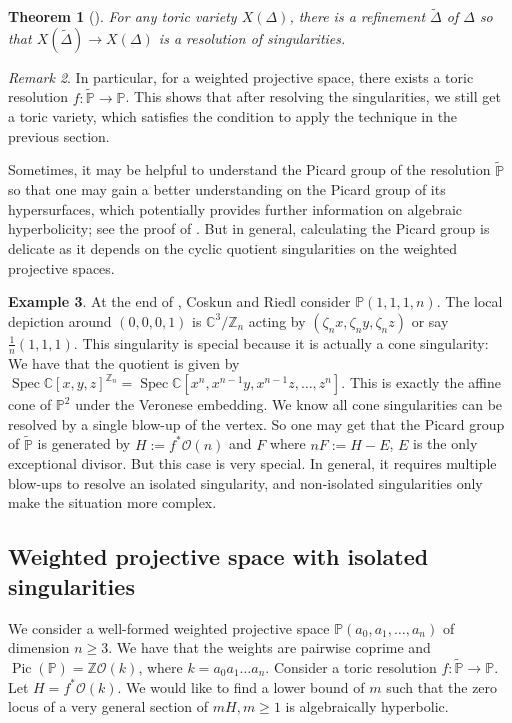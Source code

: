 \documentclass{amsart}
\newtheorem{theorem}{Theorem}[section]
\theoremstyle{definition}
\newtheorem{example}[theorem]{Example}
\theoremstyle{remark}
\newtheorem{remark}[theorem]{Remark}
\begin{document}
\begin{theorem}[{\cite[p.~48]{Fulton1993}}]
    For any toric variety $X(\Delta)$, there is a refinement $\widetilde{\Delta}$ of $\Delta$ so that $X(\widetilde{\Delta})\to X(\Delta)$ is a resolution of singularities.
\end{theorem}
\begin{remark}
In particular, for a weighted projective space, there exists a toric resolution $f:\widetilde{\mathbb P}\to \mathbb P$. This shows that after resolving the singularities, we still get a toric variety, which satisfies the condition to apply the technique in the previous section.
\end{remark}

Sometimes, it may be helpful to understand the Picard group of the resolution $\widetilde{\mathbb P}$ so that one may gain a better understanding on the Picard group of its hypersurfaces, which potentially provides further information on algebraic hyperbolicity; see the proof of \cite[Proposition 3.10]{coskun2019algebraichyperbolicitygeneralsurfaces}. But in general, calculating the Picard group is delicate as it depends on the cyclic quotient singularities on the weighted projective spaces. 

\begin{example}  At the end of \cite{coskun2019algebraichyperbolicitygeneralsurfaces}, Coskun and Riedl consider $\mathbb{P}(1,1,1,n)$. The local depiction around $(0,0,0,1)$ is $\mathbb{C}^3/\mathbb{Z}_n$ acting by $(\zeta_n x, \zeta_n y, \zeta_n z)$ or say $\frac{1}{n} (1,1,1)$.   This singularity is special because it is actually a cone singularity: We have that the quotient is given by $\operatorname{Spec } \mathbb{C}[x,y,z]^{\mathbb Z_n} = \operatorname{Spec } \mathbb{C}[x^n, x^{n-1}y, x^{n-1}z,\ldots,z^n]$. This is exactly the affine cone of $\mathbb{P}^2$ under the Veronese embedding. We know all cone singularities can be resolved by a single blow-up of the vertex. So one may get that the Picard group of $\widetilde{\mathbb P}$ is generated by $H:= f^*\mathcal O(n)$ and $F$ where $nF:= H-E$, $E$ is the only exceptional divisor. But this case is very special. In general, it requires multiple blow-ups to resolve an isolated singularity, and non-isolated singularities only make the situation more complex.
\end{example}



\subsection{Weighted projective space with isolated singularities}
We consider a well-formed weighted projective space $\mathbb{P}(a_0,a_1,\dots,a_n)$ of dimension $n\geq 3$. We have that the weights are pairwise coprime and $\operatorname{Pic}(\mathbb{P}) = \mathbb{Z} \mathcal{O}(k )$, where $k=a_0a_1\dots a_n$. Consider a toric resolution $f: \widetilde{\mathbb{P}} \to \mathbb{P}$. Let $H = f^*\mathcal{O}(k)$. We would like to find a lower bound of $m$ such that the zero locus of a very general section of $mH, m\geq 1$ is algebraically hyperbolic.
\end{document}
